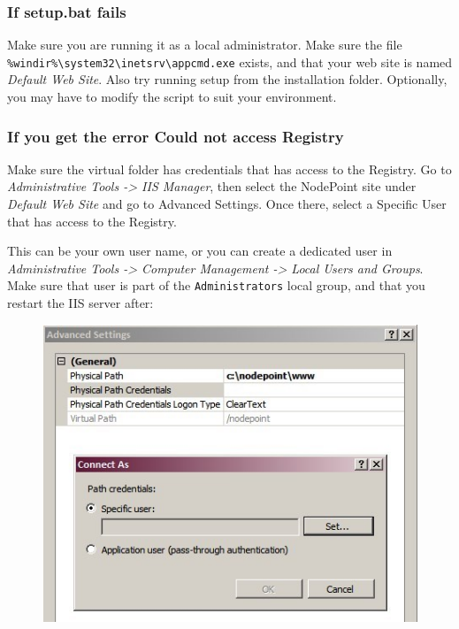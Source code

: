 \documentclass[11pt]{article}
\begin{document}
{
\subsubsection{If setup.bat fails}

Make sure you are running it as a local administrator. Make sure the file \texttt{\%windir\%\textbackslash system32\textbackslash inetsrv\textbackslash appcmd.exe} exists, and that your web site is named \textit{Default Web Site}. Also try running setup from the installation folder. Optionally, you may have to modify the script to suit your environment.

\subsubsection{If you get the error Could not access Registry}

Make sure the virtual folder has credentials that has access to the Registry. Go to \textit{Administrative Tools -> IIS Manager}, then select the NodePoint site under \textit{Default Web Site} and go to Advanced Settings. Once there, select a Specific User that has access to the Registry.

This can be your own user name, or you can create a dedicated user in \textit{Administrative Tools -> Computer Management -> Local Users and Groups}. Make sure that user is part of the \texttt{Administrators} local group, and that you restart the IIS server after:

\begin{figure}[h]
\includegraphics{iisaccount.jpg}
\end{figure}

}
\end{document}
